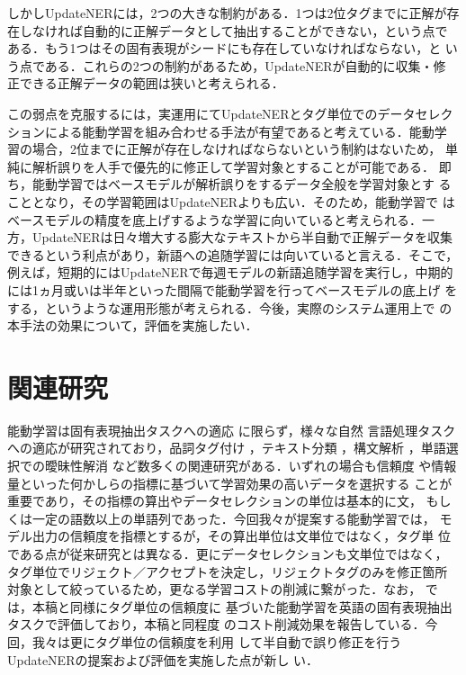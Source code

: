 \documentclass[japanese]{jnlp_1.4}
\begin{document}
しかしUpdateNERには，2つの大きな制約がある．1つは2位タグまでに正解が存
在しなければ自動的に正解データとして抽出することができない，という点で
ある．もう1つはその固有表現がシードにも存在していなければならない，と
いう点である．これらの2つの制約があるため，UpdateNERが自動的に収集・修
正できる正解データの範囲は狭いと考えられる．

この弱点を克服するには，実運用にてUpdateNERとタグ単位でのデータセレク
ションによる能動学習を組み合わせる手法が有望であると考えている．能動学
習の場合，2位までに正解が存在しなければならないという制約はないため，
単純に解析誤りを人手で優先的に修正して学習対象とすることが可能である．
即ち，能動学習ではベースモデルが解析誤りをするデータ全般を学習対象とす
ることとなり，その学習範囲はUpdateNERよりも広い．そのため，能動学習で
はベースモデルの精度を底上げするような学習に向いていると考えられる．一
方，UpdateNERは日々増大する膨大なテキストから半自動で正解データを収集
できるという利点があり，新語への追随学習には向いていると言える．そこで，
例えば，短期的にはUpdateNERで毎週モデルの新語追随学習を実行し，中期的
には1ヵ月或いは半年といった間隔で能動学習を行ってベースモデルの底上げ
をする，というような運用形態が考えられる．今後，実際のシステム運用上で
の本手法の効果について，評価を実施したい．


\section{関連研究}
\label{sec-related-works}

能動学習は固有表現抽出タスクへの適応
\cite{shen-EtAl:2004:ACL,laws-schutze:2008:PAPERS}に限らず，様々な自然
言語処理タスクへの適応が研究されており，品詞タグ付け
\cite{argamonengelson99committeebased}，テキスト分類
\cite{Lewis94heterogeneousuncertainty}，構文解析
\cite{Hwa:ActiveLearning2000}，単語選択での曖昧性解消
\cite{banko_ACL_2001}など数多くの関連研究がある．いずれの場合も信頼度
や情報量といった何かしらの指標に基づいて学習効果の高いデータを選択する
ことが重要であり，その指標の算出やデータセレクションの単位は基本的に文，
もしくは一定の語数以上の単語列であった．今回我々が提案する能動学習では，
モデル出力の信頼度を指標とするが，その算出単位は文単位ではなく，タグ単
位である点が従来研究とは異なる．更にデータセレクションも文単位ではなく，
タグ単位でリジェクト／アクセプトを決定し，リジェクトタグのみを修正箇所
対象として絞っているため，更なる学習コストの削減に繋がった．なお，
\cite{tomanek-hahn:2009:ACLIJCNLP}では，本稿と同様にタグ単位の信頼度に
基づいた能動学習を英語の固有表現抽出タスクで評価しており，本稿と同程度
のコスト削減効果を報告している．今回，我々は更にタグ単位の信頼度を利用
して半自動で誤り修正を行うUpdateNERの提案および評価を実施した点が新し
い．
\end{document}
